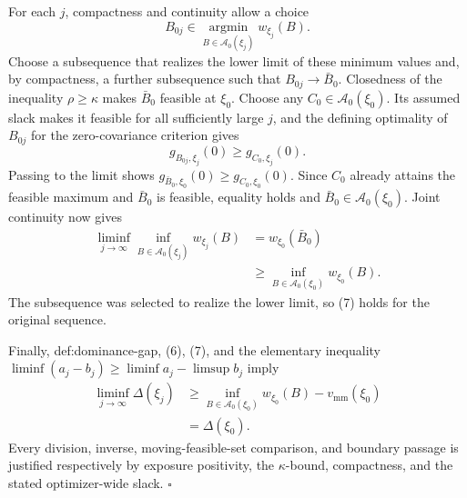 For each \(j\), compactness and continuity allow a choice
\[
B_{0j}\in\operatorname*{argmin}_{B\in\mathcal A_0(\xi_j)}w_{\xi_j}(B).
\]
Choose a subsequence that realizes the lower limit of these minimum values and, by compactness, a further subsequence such that \(B_{0j}\to\bar B_0\).  Closedness of the inequality \(\rho\ge\kappa\) makes \(\bar B_0\) feasible at \(\xi_0\).  Choose any \(C_0\in\mathcal A_0(\xi_0)\).  Its assumed slack makes it feasible for all sufficiently large \(j\), and the defining optimality of \(B_{0j}\) for the zero-covariance criterion gives
\[
g_{B_{0j},\xi_j}(0)\ge g_{C_0,\xi_j}(0).
\]
Passing to the limit shows \(g_{\bar B_0,\xi_0}(0)\ge g_{C_0,\xi_0}(0)\).  Since \(C_0\) already attains the feasible maximum and \(\bar B_0\) is feasible, equality holds and \(\bar B_0\in\mathcal A_0(\xi_0)\).  Joint continuity now gives
\[
\begin{aligned}
\liminf_{j\to\infty}\inf_{B\in\mathcal A_0(\xi_j)}w_{\xi_j}(B)
&=w_{\xi_0}(\bar B_0)\\
&\ge\inf_{B\in\mathcal A_0(\xi_0)}w_{\xi_0}(B).
\end{aligned}                                                       \tag{7}
\]
The subsequence was selected to realize the lower limit, so (7) holds for the original sequence.

Finally, def:dominance-gap, (6), (7), and the elementary inequality \(\liminf(a_j-b_j)\ge\liminf a_j-\limsup b_j\) imply
\[
\begin{aligned}
\liminf_{j\to\infty}\Delta(\xi_j)
&\ge
\inf_{B\in\mathcal A_0(\xi_0)}w_{\xi_0}(B)-v_{\mathrm{mm}}(\xi_0)\\
&=\Delta(\xi_0).
\end{aligned}
\]
Every division, inverse, moving-feasible-set comparison, and boundary passage is justified respectively by exposure positivity, the \(\kappa\)-bound, compactness, and the stated optimizer-wide slack. \(\square\)